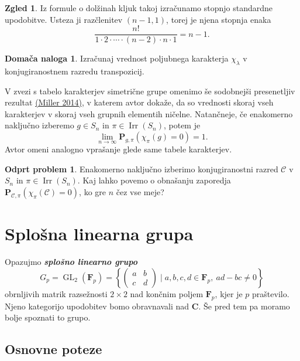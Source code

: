 \documentclass[11pt]{book}
\def\CC{\mathbf{C}}
\def\conclass{\mathcal{C}}
\def\FF{\mathbf{F}}
\def\PP{\mathbf{P}}
\DeclareMathOperator\Irr{Irr}
\DeclareMathOperator\GL{GL}
\def\definicija{\color{rdeca}\bf\em}
\theoremstyle{definition}
\theoremstyle{zgled}
\newtheorem*{zgled}{Zgled}
\theoremstyle{odprtproblem}
\newtheorem*{odprtproblem}{Odprt problem}
\theoremstyle{domacanaloga}
\newtheorem*{domacanaloga}{Domača naloga}
\theoremstyle{izrek}
\begin{document}
\begin{zgled}
Iz formule o dolžinah kljuk takoj izračunamo stopnjo standardne upodobitve. Usteza ji razčlenitev $(n-1,1)$, torej je njena stopnja enaka
\[
    \frac{n!}{1 \cdot 2 \cdot \cdots \cdot (n-2) \cdot n \cdot 1} = n-1.
\]
\end{zgled}

\begin{domacanaloga}
Izračunaj vrednost poljubnega karakterja $\chi_{\lambda}$ v konjugiranostnem razredu transpozicij.
\end{domacanaloga}

V zvezi s tabelo karakterjev simetrične grupe omenimo še sodobnejši presenetljiv rezultat \href{https://link.springer.com/article/10.1007/s00209-014-1290-x}{(Miller 2014)}, v katerem avtor dokaže, da so vrednosti skoraj vseh karakterjev v skoraj vseh grupnih elementih ničelne. Natančneje, če enakomerno naključno izberemo $g \in S_n$ in $\pi \in \Irr(S_n)$, potem je
\[
    \lim_{n \to \infty} \PP_{g, \pi}\left(\chi_{\pi}(g) = 0\right) = 1.
\]
Avtor omeni analogno vprašanje glede same tabele karakterjev.

\begin{odprtproblem}
Enakomerno naključno izberimo konjugiranostni razred $\conclass$ v $S_n$ in $\pi \in \Irr(S_n)$. Kaj lahko povemo o obnašanju zaporedja $\PP_{\conclass, \pi}\left( \chi_{\pi}(\conclass) = 0 \right)$, ko gre $n$ čez vse meje?
\end{odprtproblem}

\section{Splošna linearna grupa}

Opazujmo {\definicija splošno linearno grupo}
\[
    G_p = {\textstyle \GL_2(\FF_p)} =
    \left\{ \begin{pmatrix} a & b \\ c & d \end{pmatrix} \mid a,b,c,d \in \FF_p, \ ad - bc \neq 0 \right\}
\] 
obrnljivih matrik razsežnosti $2 \times 2$ nad končnim poljem $\FF_p$, kjer je $p$ praštevilo. Njeno kategorijo upodobitev bomo obravnavali nad $\CC$. Še pred tem pa moramo bolje spoznati to grupo.

\subsection{Osnovne poteze}
\end{document}
